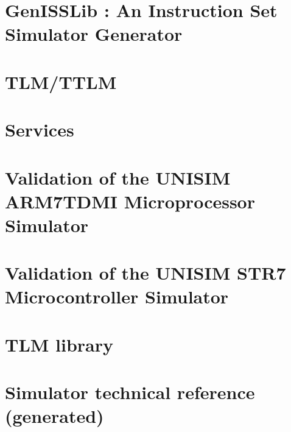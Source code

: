 \documentclass[a4paper,11pt,onecolumn]{mathese}
\begin{document}
\chapter{GenISSLib : An Instruction Set Simulator Generator}
\label{genisslib}


\chapter{TLM/TTLM}
\label{tlm_ttlm}


\chapter{Services}
\label{services}


\chapter{Validation of the UNISIM ARM7TDMI Microprocessor Simulator}
\label{arm7tdmi_validation}


\chapter{Validation of the UNISIM STR7 Microcontroller Simulator}
\label{str7_validation}


\begin{appendix}
\chapter{TLM library}
\label{tlm_appendix}


\chapter{Simulator technical reference (generated) }
\label{techref}

\end{appendix}

% 
%  




%
%
\end{document}
